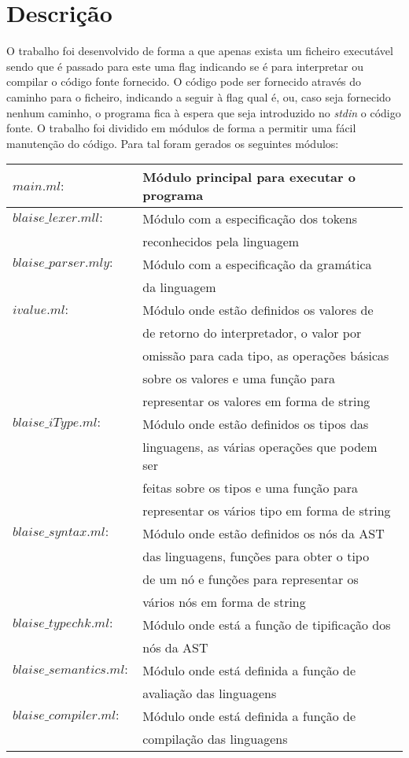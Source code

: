 \chapter{Descrição}
O trabalho foi desenvolvido de forma a que apenas exista um ficheiro executável 
sendo que é passado para este uma flag indicando se é para interpretar ou 
compilar o código fonte fornecido. O código pode ser fornecido através do 
caminho para o ficheiro, indicando a seguir à flag qual é, ou, caso seja 
fornecido nenhum caminho, o programa fica à espera que seja introduzido no 
\emph{stdin} o código fonte. O trabalho foi dividido em módulos de forma a 
permitir uma fácil manutenção do código. 
Para tal foram gerados os seguintes módulos:

\begin{tabular}{|l|l|}
\hline
$main.ml:$				& Módulo principal para executar o programa 
\\
\hline
$blaise\_lexer.mll:$	& Módulo com a especificação dos tokens 
\\										& reconhecidos pela linguagem 
\\
\hline
$blaise\_parser.mly:$	& Módulo com a especificação da gramática 
\\										& da linguagem 
\\
\hline
$ivalue.ml:$			& Módulo onde estão definidos os valores de 
\\						& de retorno do interpretador, o valor por 
\\						& omissão para cada tipo, as operações básicas 
\\						& sobre os valores e uma função para 
\\						& representar os valores em forma de string 
\\
\hline
$blaise\_iType.ml:$		& Módulo onde estão definidos os tipos das 
\\						& linguagens, as várias operações que podem ser 
\\						& feitas sobre os tipos e uma função para 
\\						& representar os vários tipo em forma de string 
\\
\hline
$blaise\_syntax.ml:$ 	& Módulo onde estão definidos os nós da AST 
\\						& das linguagens, funções para obter o tipo 
\\						& de um nó e funções para representar os 
\\						& vários nós em forma de string 
\\
\hline
$blaise\_typechk.ml:$	& Módulo onde está a função de tipificação dos 
\\						& nós da AST 
\\
\hline
$blaise\_semantics.ml:$	& Módulo onde está definida a função de 
\\						& avaliação das linguagens 
\\ 
\hline
$blaise\_compiler.ml:$	& Módulo onde está definida a função de 
\\						& compilação das linguagens 
\\
\hline
\end{tabular}

